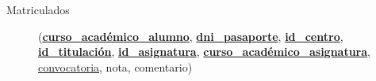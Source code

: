       \begin{description}
         \item[Matriculados] \begin{flushleft}(\underline{\textbf{curso\_académico\_alumno}},
         \underline{\textbf{dni\_pasaporte}}, \underline{\textbf{id\_centro}},
         \underline{\textbf{id\_titulación}}, \underline{\textbf{id\_asignatura}},
         \underline{\textbf{curso\_académico\_asignatura}}, \underline{convocatoria}, nota,
         comentario)\end{flushleft}
      \end{description}